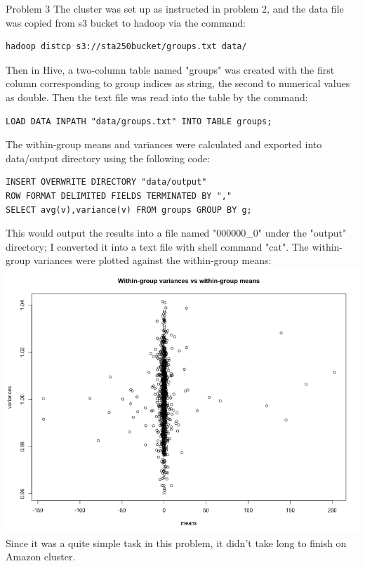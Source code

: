 \documentclass[12pt]{article}
\begin{document}
Problem 3 \newline \newline
The cluster was set up as instructed in problem 2, and the data file was copied from s3 bucket to hadoop via the command:
\begin{lstlisting}
hadoop distcp s3://sta250bucket/groups.txt data/
\end{lstlisting}
Then in Hive, a two-column table named "groups" was created with the first column corresponding to group indices as string, the second to numerical values as double. Then the text file was read into the table by the command:
\begin{lstlisting}
LOAD DATA INPATH "data/groups.txt" INTO TABLE groups;
\end{lstlisting}
The within-group means and variances were calculated and exported into data/output directory using the following code:
\begin{lstlisting}
INSERT OVERWRITE DIRECTORY "data/output"
ROW FORMAT DELIMITED FIELDS TERMINATED BY ","
SELECT avg(v),variance(v) FROM groups GROUP BY g;
\end{lstlisting}
This would output the results into a file named "000000\_0" under the "output" directory; I converted it into a text file with shell command "cat". The within-group variances were plotted against the within-group means:
\includegraphics[width=\textwidth]{meanvar.png}
Since it was a quite simple task in this problem, it didn't take long to finish on Amazon cluster.
\end{document}
